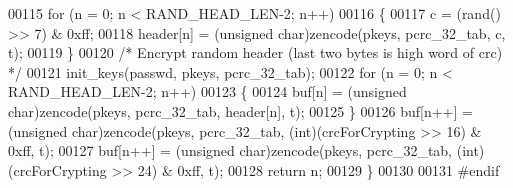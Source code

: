 \begin{DoxyCode}
00115     \textcolor{keywordflow}{for} (n = 0; n < RAND\_HEAD\_LEN-2; n++)
00116     \{
00117         c = (rand() >> 7) & 0xff;
00118         header[n] = (\textcolor{keywordtype}{unsigned} char)zencode(pkeys, pcrc\_32\_tab, c, t);
00119     \}
00120     \textcolor{comment}{/* Encrypt random header (last two bytes is high word of crc) */}
00121     init\_keys(passwd, pkeys, pcrc\_32\_tab);
00122     \textcolor{keywordflow}{for} (n = 0; n < RAND\_HEAD\_LEN-2; n++)
00123     \{
00124         buf[n] = (\textcolor{keywordtype}{unsigned} char)zencode(pkeys, pcrc\_32\_tab, header[n], t);
00125     \}
00126     buf[n++] = (\textcolor{keywordtype}{unsigned} char)zencode(pkeys, pcrc\_32\_tab, (\textcolor{keywordtype}{int})(crcForCrypting >> 16) & 0xff, t);
00127     buf[n++] = (\textcolor{keywordtype}{unsigned} char)zencode(pkeys, pcrc\_32\_tab, (\textcolor{keywordtype}{int})(crcForCrypting >> 24) & 0xff, t);
00128     \textcolor{keywordflow}{return} n;
00129 \}
00130 
00131 \textcolor{preprocessor}{#endif}
\end{DoxyCode}
